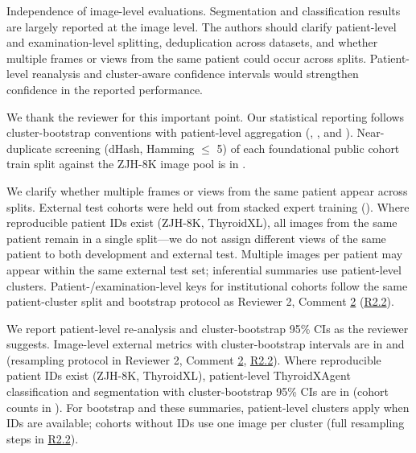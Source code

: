\label{rev:R1.1}
\begin{reviewercomment}
Independence of image-level evaluations. Segmentation and classification results are largely reported at the image level. The authors should clarify patient-level and examination-level splitting, deduplication across datasets, and whether multiple frames or views from the same patient could occur across splits. Patient-level reanalysis and cluster-aware confidence intervals would strengthen confidence in the reported performance.
\end{reviewercomment}
\begin{authorresponse}
We thank the reviewer for this important point. Our statistical reporting follows cluster-bootstrap conventions with patient-level aggregation (, , and ). Near-duplicate screening (dHash, Hamming $\leq$ 5) of each foundational public cohort train split against the ZJH-8K image pool is in .\par
We clarify whether multiple frames or views from the same patient appear across splits. External test cohorts were held out from stacked expert training (). Where reproducible patient IDs exist (ZJH-8K, ThyroidXL), all images from the same patient remain in a single split---we do not assign different views of the same patient to both development and external test. Multiple images per patient may appear within the same external test set; inferential summaries use patient-level clusters. Patient-/examination-level keys for institutional cohorts follow the same patient-cluster split and bootstrap protocol as Reviewer 2, Comment \hyperref[rev:R2.2]{2} (\hyperref[rev:R2.2]{R2.2}).\par
We report patient-level re-analysis and cluster-bootstrap 95\% CIs as the reviewer suggests. Image-level external metrics with cluster-bootstrap intervals are in  and  (resampling protocol in Reviewer 2, Comment \hyperref[rev:R2.2]{2}, \hyperref[rev:R2.2]{R2.2}). Where reproducible patient IDs exist (ZJH-8K, ThyroidXL), patient-level ThyroidXAgent classification and segmentation with cluster-bootstrap 95\% CIs are in  (cohort counts in ). For bootstrap and these summaries, patient-level clusters apply when IDs are available; cohorts without IDs use one image per cluster (full resampling steps in \hyperref[rev:R2.2]{R2.2}).\par

\end{authorresponse}
